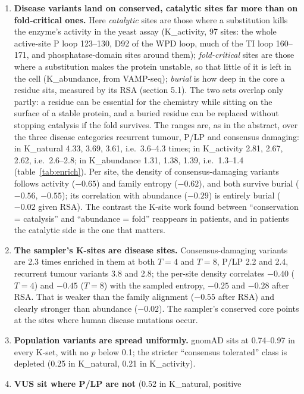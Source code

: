 \documentclass[11pt,a4paper]{article}
\begin{document}
\begin{enumerate}
\item \textbf{Disease variants land on conserved, catalytic sites far more
  than on fold-critical ones.} Here \emph{catalytic} sites are those where a
  substitution kills the enzyme's activity in the yeast assay (K\_activity,
  97 sites: the whole active-site P loop 123--130, D92 of the WPD loop, much
  of the TI loop 160--171, and phosphatase-domain sites around them);
  \emph{fold-critical} sites are those where a substitution makes the protein
  unstable, so that little of it is left in the cell (K\_abundance, from
  VAMP-seq); \emph{burial} is how deep in the core a residue sits, measured by
  its RSA (section 5.1). The two sets overlap only partly: a residue can be
  essential for the chemistry while sitting on the surface of a stable
  protein, and a buried residue can be replaced without stopping catalysis if
  the fold survives. The ranges are, as in the abstract, over the three
  disease categories recurrent tumour, P/LP and consensus damaging: in
  K\_natural 4.33, 3.69, 3.61, i.e.\ 3.6--4.3 times; in K\_activity 2.81,
  2.67, 2.62, i.e.\ 2.6--2.8; in K\_abundance 1.31, 1.38, 1.39, i.e.\ 1.3--1.4
  (table~\ref{tab:enrich}). Per site, the density of
  consensus-damaging variants follows activity ($-0.65$) and family entropy
  ($-0.62$), and both survive burial ($-0.56$, $-0.55$); its correlation with
  abundance ($-0.29$) is entirely burial ($-0.02$ given RSA). The contrast the
  K-site work found between ``conservation = catalysis'' and ``abundance =
  fold'' reappears in patients, and in patients the catalytic side is the
  one that matters.
\item \textbf{The sampler's K-sites are disease sites.} Consensus-damaging
  variants are 2.3 times enriched in them at both $T=4$ and $T=8$, P/LP 2.2
  and 2.4, recurrent tumour variants 3.8 and 2.8; the per-site density
  correlates $-0.40$ ($T=4$) and $-0.45$ ($T=8$) with the sampled entropy,
  $-0.25$ and $-0.28$ after RSA. That is weaker than the family alignment
  ($-0.55$ after RSA) and clearly stronger than abundance ($-0.02$).
  The sampler's conserved core points at the sites where human disease
  mutations occur.
\item \textbf{Population variants are spread uniformly.} gnomAD sits at
  0.74--0.97 in every K-set, with no $p$ below 0.1; the stricter
  ``consensus tolerated'' class is depleted (0.25 in K\_natural, 0.21 in
  K\_activity).
\item \textbf{VUS sit where P/LP are not} (0.52 in K\_natural, positive

\end{enumerate}
\end{document}
